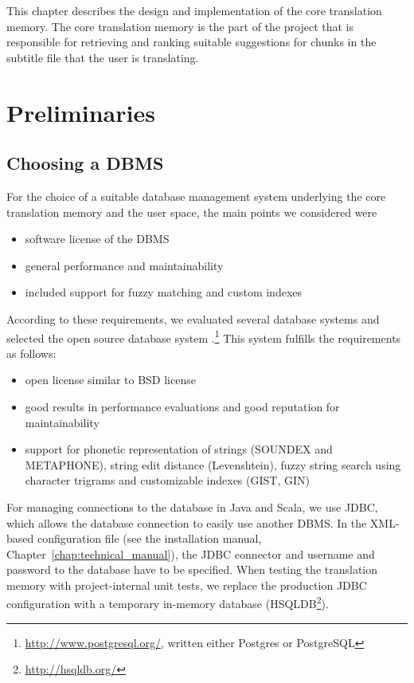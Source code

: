 This chapter describes the design and implementation of the core translation memory. The core translation memory is the part of the project that is responsible for retrieving and ranking suitable suggestions for chunks in the subtitle file that the user is translating.

\section{Preliminaries}

\subsection{Choosing a DBMS}
\label{sec:dbms}

For the choice of a suitable database management system underlying the
core translation memory and the user space, the main points we
considered were

\begin{itemize}
\item
  software license of the DBMS
\item
  general performance and maintainability
\item
  included support for fuzzy matching and custom indexes
\end{itemize}
According to these requirements, we evaluated several database systems
and selected the open source database system
\postgres.\footnote{\url{http://www.postgresql.org/}, written either Postgres or PostgreSQL} This system
fulfills the requirements as follows:

\begin{itemize}
\item
  open license similar to BSD license
\item
  good results in performance evaluations and good reputation for
  maintainability
\item
  support for phonetic representation of strings (SOUNDEX and
  METAPHONE), string edit distance (Levenshtein), fuzzy string search
  using character trigrams and customizable indexes (GIST, GIN)
\end{itemize}

For managing connections to the database in Java and Scala, we use JDBC, 
which allows the database connection to easily use another DBMS. 
In the XML-based configuration file (see the installation manual, Chapter~\ref{chap:technical_manual}), the JDBC connector
and username and password to the database have to be specified. When testing the
translation memory with project-internal unit tests, we replace the production JDBC
configuration with a temporary in-memory database (HSQLDB\footnote{\url{http://hsqldb.org/}}).


